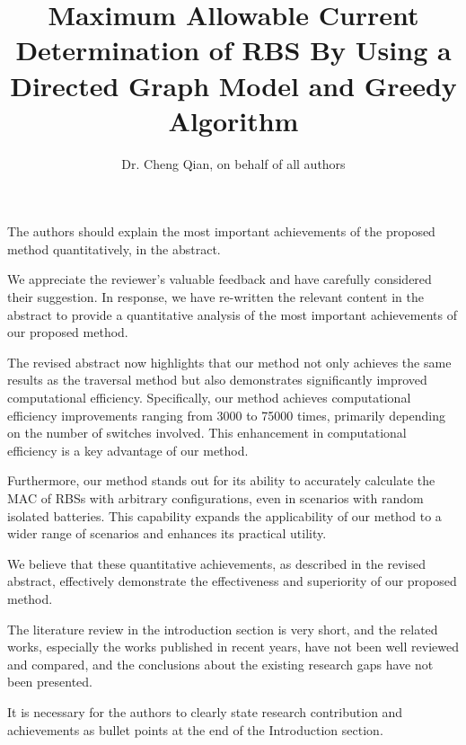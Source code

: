 \documentclass[12pt,american]{scrartcl}
\title{Maximum Allowable Current Determination of RBS By Using a Directed Graph Model and Greedy Algorithm}
\author{Dr. Cheng Qian, on behalf of all authors}
\begin{document}
\maketitle




\reviewer
\begin{revcomment}
	The authors should explain the most important achievements of the proposed method quantitatively, in the abstract.
\end{revcomment}
\begin{revresponse}
	We appreciate the reviewer's valuable feedback and have carefully considered their suggestion. In response, we have re-written the relevant content in the abstract to provide a quantitative analysis of the most important achievements of our proposed method.

	The revised abstract now highlights that our method not only achieves the same results as the traversal method but also demonstrates significantly improved computational efficiency. Specifically, our method achieves computational efficiency improvements ranging from 3000 to 75000 times, primarily depending on the number of switches involved. This enhancement in computational efficiency is a key advantage of our method.

	Furthermore, our method stands out for its ability to accurately calculate the MAC of RBSs with arbitrary configurations, even in scenarios with random isolated batteries. This capability expands the applicability of our method to a wider range of scenarios and enhances its practical utility.

	We believe that these quantitative achievements, as described in the revised abstract, effectively demonstrate the effectiveness and superiority of our proposed method.
\end{revresponse}

\begin{revcomment}
	The literature review in the introduction section is very short, and the related works, especially the works published in recent years, have not been well reviewed and compared, and the conclusions about the existing research gaps have not been presented.
\end{revcomment}
\begin{revresponse}
	
\end{revresponse}

\begin{revcomment}
	It is necessary for the authors to clearly state research contribution and achievements as bullet points at the end of the Introduction section.
\end{revcomment}
\begin{revresponse}
	
\end{revresponse}
\end{document}
